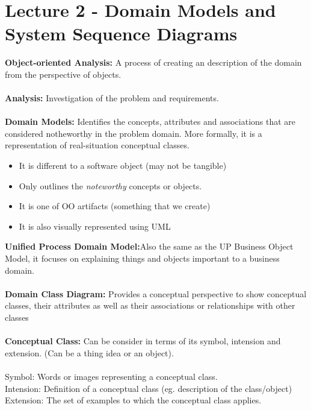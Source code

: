 \documentclass[a4paper,10pt]{article}
\begin{document}
\section*{Lecture 2 - Domain Models and System Sequence Diagrams}
\textcolor{Emerald}{\textbf{Object-oriented Analysis:}} A process of creating an description of the domain from the perspective of objects.\\\\
\textcolor{Emerald}{\textbf{Analysis:}} Investigation of the problem and requirements.\\\\
\textcolor{Emerald}{\textbf{Domain Models:}} Identifies the concepts, attributes and associations that are considered notheworthy in the problem domain. More formally, it is a representation of real-situation conceptual classes.\\
\renewcommand{\labelitemi}{\textperiodcentered}
\begin{itemize}
  \item It is different to a software object (may not be tangible)
  \item Only outlines the \emph{noteworthy} concepts or objects. 
  \item It is one of OO artifacts (something that we create)
  \item It is also visually represented using UML 
\end{itemize}
\textcolor{Emerald}{\textbf{Unified Process Domain Model:}}Also the same as the UP Business Object Model, it focuses on explaining things and objects important to a business domain.\\\\
\textcolor{Emerald}{\textbf{Domain Class Diagram:}} Provides a conceptual perspective to show conceptual classes, their attributes as well as their associations or relationships with other classes\\\\
\textcolor{Emerald}{\textbf{Conceptual Class:}} Can be consider in terms of its symbol, intension and extension. (Can be a thing idea or an object).\\ \\
\indent \textcolor{Emerald}{Symbol:} Words or images representing a conceptual class.\\
\indent \textcolor{Emerald}{Intension:} Definition of a conceptual class (eg. description of the class/object) \\
\indent \textcolor{Emerald}{Extension:} The set of examples to which the conceptual class applies. \\ \\
\end{document}
